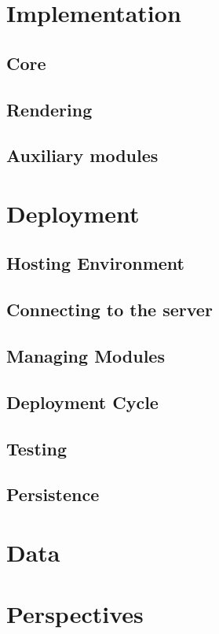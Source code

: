 \documentclass{tufte-book}
\begin{document}

\section{Implementation}
\subsection{Core}
\subsection{Rendering}
\subsection{Auxiliary modules}


\section{Deployment}
\subsection{Hosting Environment}
\subsection{Connecting to the server}
\subsection{Managing Modules}
\subsection{Deployment Cycle}
\subsection{Testing}
\subsection{Persistence}


\section{Data}


\section{Perspectives}
\end{document}
